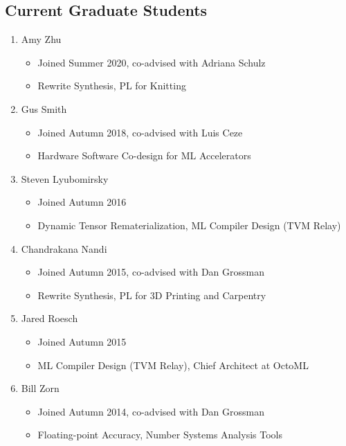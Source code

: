 \documentclass[10pt]{article}
\begin{document}
\subsection*{Current Graduate Students}

\begin{enumerate}
  \item Amy Zhu
    \begin{itemize}
      \item Joined Summer 2020, co-advised with Adriana Schulz
      \item Rewrite Synthesis, PL for Knitting
    \end{itemize}

  \item Gus Smith
    \begin{itemize}
      \item Joined Autumn 2018, co-advised with Luis Ceze
      \item Hardware Software Co-design for ML Accelerators
    \end{itemize}

  \item Steven Lyubomirsky
    \begin{itemize}
      \item Joined Autumn 2016
      \item Dynamic Tensor Rematerialization, ML Compiler Design (TVM Relay)
    \end{itemize}

  \item Chandrakana Nandi
    \begin{itemize}
      \item Joined Autumn 2015, co-advised with Dan Grossman
      \item Rewrite Synthesis, PL for 3D Printing and Carpentry
    \end{itemize}

  \item Jared Roesch
    \begin{itemize}
      \item Joined Autumn 2015
      \item ML Compiler Design (TVM Relay), Chief Architect at OctoML
    \end{itemize}

  \item Bill Zorn
    \begin{itemize}
      \item Joined Autumn 2014, co-advised with Dan Grossman
      \item Floating-point Accuracy, Number Systems Analysis Tools
    \end{itemize}
\end{enumerate}
\end{document}
